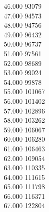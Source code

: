 { 46.000	93079 \\
 47.000	94573 \\
 48.000	94756 \\
 49.000	96432 \\
 50.000	96737 \\
 51.000	97561 \\
 52.000	98689 \\
 53.000	99024 \\
 54.000	99878 \\
 55.000	101067 \\
 56.000	101402 \\
 57.000	102896 \\
 58.000	103262 \\
 59.000	106067 \\
 60.000	106280 \\
 61.000	106463 \\
 62.000	109054 \\
 63.000	110335 \\
 64.000	111615 \\
 65.000	111798 \\
 66.000	116371 \\
 67.000	122804 \\
}
